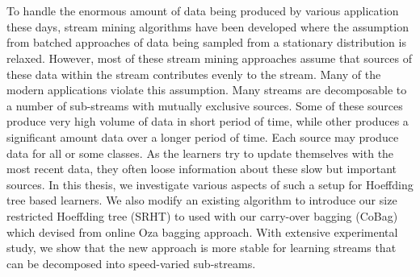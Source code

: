 \chapter{\abstractname}
To handle the enormous amount of data being produced by various application these days, stream mining algorithms have been developed where the assumption from batched approaches of data being sampled from a stationary distribution is relaxed.
However, most of these stream mining approaches assume that sources of these data within the stream contributes evenly to the stream.
Many of the modern applications violate this assumption. Many streams are decomposable to a number of sub-streams with mutually exclusive sources. Some of these sources produce very high volume of data in short period of time, while other produces a significant amount data over a longer period of time. Each source may produce data for all or some classes.
As the learners try to update themselves with the most recent data, they often loose information about these slow but important sources.
In this thesis, we investigate various aspects of such a setup for Hoeffding tree based learners. We also modify an existing algorithm to introduce our size restricted Hoeffding tree (SRHT) to used with our carry-over bagging (CoBag) which devised from online Oza bagging approach. With extensive experimental study, we show that the new approach is more stable for learning streams that can be decomposed into speed-varied sub-streams.

